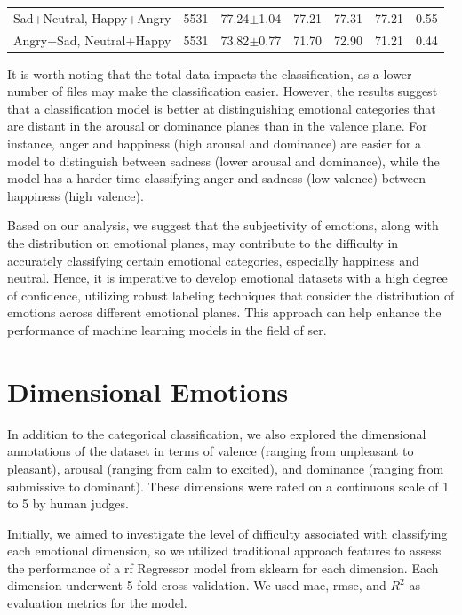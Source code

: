 \begin{table}[H]
{\begin{tabular}{lrrrrrr}
			\addlinespace[2mm]
			
			Sad+Neutral, Happy+Angry  &         5531 & 77.24$\pm$1.04 & 77.21 & 77.31 &	77.21 & 0.55 \\
			Angry+Sad, Neutral+Happy  &         5531 & 73.82$\pm$0.77 &	71.70 & 72.90 & 71.21 & 0.44 \\
			
			\bottomrule
		\end{tabular}%
	}
\end{table}


It is worth noting that the total data impacts the classification, as a lower number of files may make the classification easier. However, the results suggest that a classification model is better at distinguishing emotional categories that are distant in the arousal or dominance planes than in the valence plane. For instance, anger and happiness (high arousal and dominance) are easier for a model to distinguish between sadness (lower arousal and dominance), while the model has a harder time classifying anger and sadness (low valence) between happiness (high valence).

Based on our analysis, we suggest that the subjectivity of emotions, along with the distribution on emotional planes, may contribute to the difficulty in accurately classifying certain emotional categories, especially happiness and neutral. Hence, it is imperative to develop emotional datasets with a high degree of confidence, utilizing robust labeling techniques that consider the distribution of emotions across different emotional planes. This approach can help enhance the performance of machine learning models in the field of \ac{ser}.


\section{Dimensional Emotions}

In addition to the categorical classification, we also explored the dimensional annotations of the dataset in terms of valence (ranging from unpleasant to pleasant), arousal (ranging from calm to excited), and dominance (ranging from submissive to dominant). These dimensions were rated on a continuous scale of 1 to 5 by human judges.

Initially, we aimed to investigate the level of difficulty associated with classifying each emotional dimension, so we utilized traditional approach features to assess the performance of a \ac{rf} Regressor model from sklearn for each dimension. Each dimension underwent 5-fold cross-validation. We used \ac{mae}, \ac{rmse}, and $R^2$ as evaluation metrics for the model.

